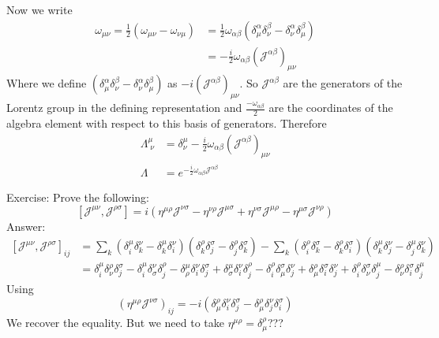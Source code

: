 Now we write
\begin{align*}
\omega_{\mu\nu} = \frac{1}{2} \left(\omega_{\mu\nu} - \omega_{\nu\mu}\right) &= \frac{1}{2}\omega_{\alpha\beta}\left(\delta^\alpha_\mu\delta^\beta_\nu - \delta^\alpha_\nu\delta^\beta_\mu\right) \\
&= - \frac{i}{2}\omega_{\alpha\beta} \left(\mathcal{J}^{\alpha\beta}\right)_{\mu\nu}
\end{align*}
Where we define $\left(\delta^\alpha_\mu\delta^\beta_\nu - \delta^\alpha_\nu\delta^\beta_\mu\right)$ as $-i \left(\mathcal{J}^{\alpha\beta}\right)_{\mu\nu}$. So $\mathcal{J}^{\alpha\beta}$ are the generators of the Lorentz group in the defining representation and $\frac{-\omega_{\alpha\beta}}{2}$ are the coordinates of the algebra element with respect to this basis of generators. Therefore
\begin{align*}
\Lambda^\mu_{\;\nu} &= \delta^\mu_\nu - \frac{i}{2}\omega_{\alpha\beta}\left(\mathcal{J}^{\alpha\beta}\right)_{\mu\nu} \\
\Lambda &= e^{- \frac{i}{2}\omega_{\alpha\beta}\mathcal{J}^{\alpha\beta}}
\end{align*}

\begin{example}
Exercise: Prove the following:
\[ [\mathcal{J}^{\mu\nu},\mathcal{J}^{\rho\sigma}] = i \left(\eta^{\mu\rho}\mathcal{J}^{\nu\sigma}-\eta^{\nu\rho}\mathcal{J}^{\mu\sigma}+\eta^{\nu\sigma}\mathcal{J}^{\mu\rho}-\eta^{\mu\sigma}\mathcal{J}^{\nu\rho}\right) \]
Answer:
\begin{align*}
\left[\mathcal{J}^{\mu\nu}, \mathcal{J}^{\rho\sigma} \right]_{ij} &= \sum_k \left(\delta^\mu_i\delta^\nu_k - \delta^\mu_k\delta^\nu_i\right)\left(\delta^\rho_k\delta^\sigma_j-\delta_j^\rho\delta^\sigma_k\right) - \sum_k \left(\delta^\rho_i\delta^\sigma_k-\delta^\rho_k\delta^\sigma_i\right)\left(\delta^\mu_k\delta^\nu_j-\delta^\mu_j\delta^\nu_k\right) \\
&= \delta^\mu_i\delta^\rho_\nu\delta^\sigma_j - \delta^\mu_i\delta^\nu_\sigma\delta^\rho_j - \delta^\mu_\rho\delta^\nu_i\delta^\sigma_j + \delta^\mu_\sigma\delta^\nu_i\delta^\rho_j - \delta^\rho_i\delta^\sigma_\mu\delta^\nu_j + \delta^\rho_\mu\delta^\sigma_i\delta^\nu_j +\delta^\rho_i\delta^\sigma_\nu\delta^\mu_j - \delta^\rho_\nu\delta^\sigma_i\delta^\mu_j
\end{align*}
Using
\[ \left(\eta^{\mu\rho}\mathcal{J}^{\nu\sigma}\right)_{ij} = -i \left(\delta^\rho_\mu\delta^\nu_i\delta^\sigma_j - \delta^\rho_\mu\delta^\nu_j\delta^\sigma_i\right) \]
We recover the equality. But we need to take $\eta^{\mu\rho} = \delta^\rho_\mu$???
\end{example}

